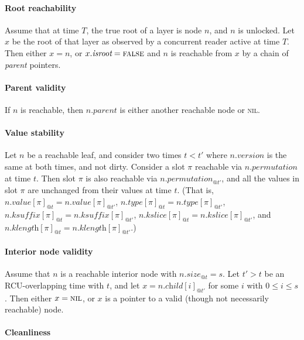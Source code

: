 \documentclass[11pt]{article}
\makeatletter
\newcommand{\FALSE}{\textsc{false}}
\newcommand{\V}[1]{\textit{#1}}
\newcommand{\NIL}{\textsc{nil}}
\newcommand{\AT}[2]{\ensuremath{#1_{@#2}}}
\makeatother
\begin{document}
\paragraph{Root reachability}

Assume that at time \(T\), the true root of a layer is node \(n\), and
\(n\) is unlocked. Let \(x\) be the root of that layer as observed by
a concurrent reader active at time \(T\). Then either \(x=n\), or
\(x.\V{isroot} = \FALSE\) and \(n\) is reachable from \(x\) by a chain
of \V{parent} pointers.

\paragraph{Parent validity}

If \(n\) is reachable, then \(n.\V{parent}\) is either another
reachable node or \NIL.

\paragraph{Value stability}

Let \(n\) be a reachable leaf, and consider two times \(t<t'\) where
\(n.\V{version}\) is the same at both times, and not dirty. Consider a
slot \(\pi\) reachable via \(n.\V{permutation}\) at time \(t\). Then
slot \(\pi\) is also reachable via \(\AT{n.\V{permutation}}{t'}\), and
all the values in slot \(\pi\) are unchanged from their values at time
\(t\). (That is, \(\AT{n.\V{value}[\pi]}{t} =
\AT{n.\V{value}[\pi]}{t'}\), \(\AT{n.\V{type}[\pi]}{t} =
\AT{n.\V{type}[\pi]}{t'}\), \(\AT{n.\V{ksuffix}[\pi]}{t} =
\AT{n.\V{ksuffix}[\pi]}{t'}\), \(\AT{n.\V{kslice}[\pi]}{t} =
\AT{n.\V{kslice}[\pi]}{t'}\), and \(\AT{n.\V{klength}[\pi]}{t} =
\AT{n.\V{klength}[\pi]}{t'}\).)

\paragraph{Interior node validity}

Assume that \(n\) is a reachable interior node with
\(\AT{n.\V{size}}{t} = s\). Let \(t'>t\) be an RCU-overlapping time with
\(t\), and let \(x = \AT{n.\V{child}[i]}{t'}\) for some \(i\) with \(0
\leq i \leq s\). Then either \(x = \NIL\), or \(x\) is a pointer to a
valid (though not necessarily reachable) node.

\paragraph{Cleanliness}
\end{document}
